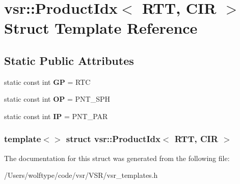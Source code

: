 \hypertarget{structvsr_1_1_product_idx_3_01_r_t_t_00_01_c_i_r_01_4}{\section{vsr\-:\-:Product\-Idx$<$ R\-T\-T, C\-I\-R $>$ Struct Template Reference}
\label{structvsr_1_1_product_idx_3_01_r_t_t_00_01_c_i_r_01_4}
}
\subsection*{Static Public Attributes}
\begin{DoxyCompactItemize}
\item 
\hypertarget{structvsr_1_1_product_idx_3_01_r_t_t_00_01_c_i_r_01_4_a1f47d15f3b0843fea946c5f65389a636}{static const int {\bfseries G\-P} = R\-T\-C}\label{structvsr_1_1_product_idx_3_01_r_t_t_00_01_c_i_r_01_4_a1f47d15f3b0843fea946c5f65389a636}

\item 
\hypertarget{structvsr_1_1_product_idx_3_01_r_t_t_00_01_c_i_r_01_4_a4098396f3b3488136faeb8ed98a1dfee}{static const int {\bfseries O\-P} = P\-N\-T\-\_\-\-S\-P\-H}\label{structvsr_1_1_product_idx_3_01_r_t_t_00_01_c_i_r_01_4_a4098396f3b3488136faeb8ed98a1dfee}

\item 
\hypertarget{structvsr_1_1_product_idx_3_01_r_t_t_00_01_c_i_r_01_4_ad6bf3de29c73bda9ff00029a2981bf9b}{static const int {\bfseries I\-P} = P\-N\-T\-\_\-\-P\-A\-R}\label{structvsr_1_1_product_idx_3_01_r_t_t_00_01_c_i_r_01_4_ad6bf3de29c73bda9ff00029a2981bf9b}

\end{DoxyCompactItemize}
\subsubsection*{template$<$$>$ struct vsr\-::\-Product\-Idx$<$ R\-T\-T, C\-I\-R $>$}



The documentation for this struct was generated from the following file\-:\begin{DoxyCompactItemize}
\item 
/\-Users/wolftype/code/vsr/\-V\-S\-R/vsr\-\_\-templates.\-h\end{DoxyCompactItemize}
